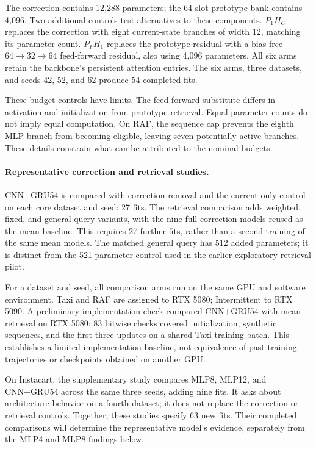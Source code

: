 \documentclass[runningheads]{llncs}
\begin{document}
The correction contains 12,288 parameters; the 64-slot prototype bank contains 4,096. Two additional controls test alternatives to these components. $P_1H_C$ replaces the correction with eight current-state branches of width 12, matching its parameter count. $P_FH_1$ replaces the prototype residual with a bias-free $64\!\to\!32\!\to\!64$ feed-forward residual, also using 4,096 parameters. All six arms retain the backbone's persistent attention entries. The six arms, three datasets, and seeds 42, 52, and 62 produce 54 completed fits.

These budget controls have limits. The feed-forward substitute differs in activation and initialization from prototype retrieval. Equal parameter counts do not imply equal computation. On RAF, the sequence cap prevents the eighth MLP branch from becoming eligible, leaving seven potentially active branches. These details constrain what can be attributed to the nominal budgets.

\paragraph{Representative correction and retrieval studies.}
CNN+GRU54 is compared with correction removal and the current-only control on each core dataset and seed: 27 fits. The retrieval comparison adds weighted, fixed, and general-query variants, with the nine full-correction models reused as the mean baseline. This requires 27 further fits, rather than a second training of the same mean models. The matched general query has 512 added parameters; it is distinct from the 521-parameter control used in the earlier exploratory retrieval pilot.

For a dataset and seed, all comparison arms run on the same GPU and software environment. Taxi and RAF are assigned to RTX 5080; Intermittent to RTX 5090. A preliminary implementation check compared CNN+GRU54 with mean retrieval on RTX 5080: 83 bitwise checks covered initialization, synthetic sequences, and the first three updates on a shared Taxi training batch. This establishes a limited implementation baseline, not equivalence of past training trajectories or checkpoints obtained on another GPU.

On Instacart, the supplementary study compares MLP8, MLP12, and CNN+GRU54 across the same three seeds, adding nine fits. It asks about architecture behavior on a fourth dataset; it does not replace the correction or retrieval controls. Together, these studies specify 63 new fits. Their completed comparisons will determine the representative model's evidence, separately from the MLP4 and MLP8 findings below.
\end{document}
